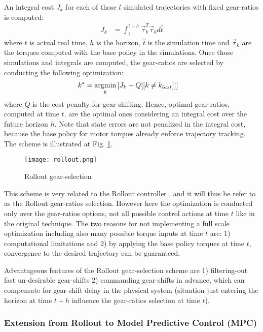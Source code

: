 An integral cost $J_k$ for each of those $l$ simulated trajectories with fixed gear-ratios is computed:
%
\begin{align}
J_k &= \int_t^{t+h} \vec{\tau}_k^T \vec{\tau}_k d\hat{t}
\end{align}
%
where $t$ is actual real time, $h$ is the horizon, $\hat{t}$ is the simulation time and $\vec{\tau}_k$ are the torques computed with the base policy in the simulations. Once those simulations and integrals are computed, the gear-ratios are selected by conducting the following optimization:
%
\begin{align}
k^{*}      &= \operatornamewithlimits{argmin}\limits_{k} \left[ J_k + Q [[ k \neq k_{last}]] \right] %
\end{align}
%
where $Q$ is the cost penalty for gear-shifting. Hence, optimal gear-ratios, computed at time $t$, are the optimal ones considering an integral cost over the future horizon $h$. Note that state errors are not penalized in the integral cost, because the base policy for motor torques already enforce trajectory tracking. The scheme is illustrated at Fig. \ref{fig:rollout}.
%
\begin{figure}[htp]
	\centering
		\texttt{[image: rollout.png]}
	\caption[Rollout gear-selection]{Rollout gear-selection}
	\label{fig:rollout}
\end{figure}


This scheme is very related to the Rollout controller \cite{bertsekas_dynamic_2000}, and it will thus be refer to as the Rollout gear-ratios selection.  However here the optimization is conducted only over the gear-ratios options, not all possible control actions at time $t$ like in the original technique. The two reasons for not implementing a full scale optimization including also many possible torque inputs at time $t$ are: 1) computational limitations and 2) by applying the base policy torques at time $t$, convergence to the desired trajectory can be guaranteed. 

Advantageous features of the Rollout gear-selection scheme are 1) filtering-out fast un-desirable gear-shifts 2) commanding gear-shifts in advance, which can compensate for gear-shift delay in the physical system (situation just entering the horizon at time $t+h$ influence the gear-ratios selection at time $t$).

\subsubsection{Extension from Rollout to Model Predictive Control (MPC)}

